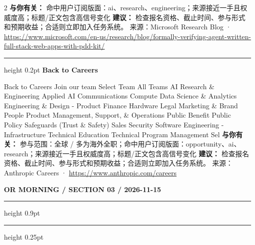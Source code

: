 \documentclass[10.5pt]{ctexart}
\begin{document}
\begin{multicols}{2}
\textbf{与你有关：} 命中用户订阅版面：ai、research、engineering；来源接近一手且权威度高；标题/正文包含高信号变化
\textbf{建议：} 检查报名资格、截止时间、参与形式和预期收益；合适则立即加入任务系统。
{\footnotesize\color{ormuted} 来源：Microsoft Research Blog · \url{https://www.microsoft.com/en-us/research/blog/formally-verifying-agent-written-full-stack-web-apps-with-pdd-kit/}}
\vspace{2mm}
\hrule height 0.2pt
\vspace{2mm}
{\large\bfseries Back to Careers}\par
Back to Careers Join our team Select Team All Teams AI Research \& Engineering Applied AI Communications Compute Data Science \& Analytics Engineering \& Design - Product Finance Hardware Legal Marketing \& Brand People Product Management, Support, \& Operations Public Benefit Public Policy Safeguards (Trust \& Safety) Sales Security Software Engineering - Infrastructure Technical Education Technical Program Management Sel
\textbf{与你有关：} 参与范围：全球 / 多为海外全职；命中用户订阅版面：opportunity、ai、research；来源接近一手且权威度高；标题/正文包含高信号变化
\textbf{建议：} 检查报名资格、截止时间、参与形式和预期收益；合适则立即加入任务系统。
{\footnotesize\color{ormuted} 来源：Anthropic Careers · \url{https://www.anthropic.com/careers}}
\end{multicols}
\newpage
{\small\bfseries OR MORNING / SECTION 03 / 2026-11-15}
\vspace{2mm}
\hrule height 0.9pt
\vspace{1.5mm}
\hrule height 0.25pt
\vspace{4mm}
\end{document}
